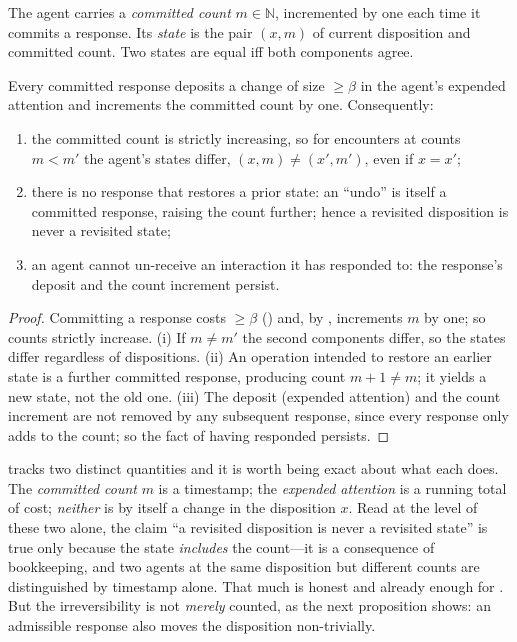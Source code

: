 \documentclass[11pt,twocolumn,a4paper]{article}
\newcommand{\N}{\mathbb{N}}
\newcommand{\floorc}{\beta}          %
\begin{document}
\begin{definition}
\label{def:history}
The agent carries a \emph{committed count} $m\in\N$, incremented by one
each time it commits a response. Its \emph{state} is the pair
$(x,m)$ of current disposition and committed count. Two states are equal
iff both components agree.
\end{definition}

\begin{theorem}
\label{thm:irreversible}
Every committed response deposits a change of size $\ge\floorc$ in the
agent's expended attention and increments the committed count by one.
Consequently:
\begin{enumerate}[label=\textup{(\roman*)},leftmargin=2.2em]
\item the committed count is strictly increasing, so for encounters at
counts $m<m'$ the agent's states differ, $(x,m)\neq(x',m')$, even if
$x=x'$;
\item there is no response that restores a prior state: an ``undo'' is
itself a committed response, raising the count further; hence a revisited
disposition is never a revisited state;
\item an agent cannot un-receive an interaction it has responded to: the
response's deposit and the count increment persist.
\end{enumerate}
\end{theorem}

\begin{proof}
Committing a response costs $\ge\floorc$ () and, by
, increments $m$ by one; so counts strictly increase.
(i) If $m\neq m'$ the second components differ, so the states differ
regardless of dispositions. (ii) An operation intended to restore an
earlier state is a further committed response, producing count $m+1\neq m$;
it yields a new state, not the old one. (iii) The deposit (expended
attention) and the count increment are not removed by any subsequent
response, since every response only adds to the count; so the fact of
having responded persists.
\end{proof}

\begin{remark}
\label{rem:two-quantities}
 tracks two distinct quantities and it is worth being
exact about what each does. The \emph{committed count} $m$ is a timestamp;
the \emph{expended attention} is a running total of cost; \emph{neither} is
by itself a change in the disposition $x$. Read at the level of these two
alone, the claim ``a revisited disposition is never a revisited state'' is
true only because the state \emph{includes} the count---it is a consequence
of bookkeeping, and two agents at the same disposition but different counts
are distinguished by timestamp alone. That much is honest and already
enough for . But the irreversibility is not
\emph{merely} counted, as the next proposition shows: an admissible
response also moves the disposition non-trivially.
\end{remark}
\end{document}
